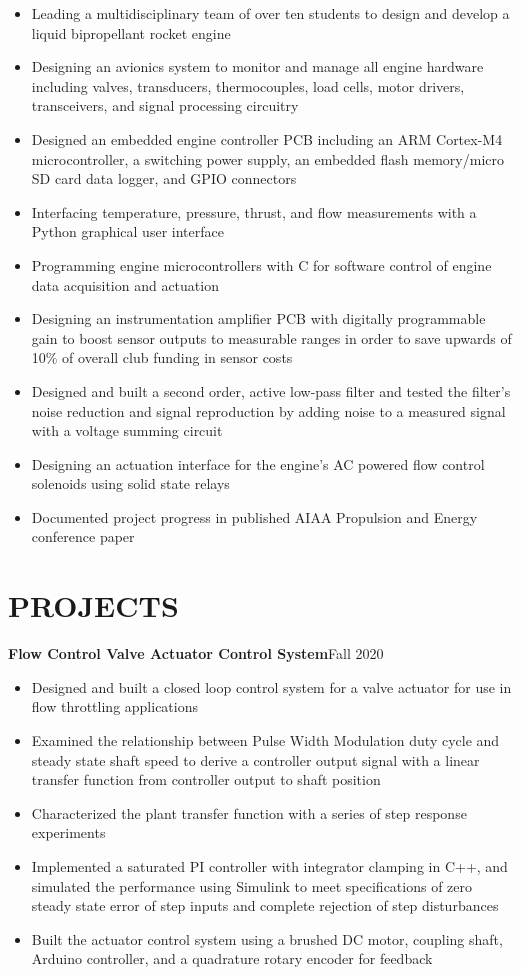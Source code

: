 \documentclass{article}
\begin{document}
\begin{itemize}
\item{Leading a multidisciplinary team of over ten students to design and develop a liquid bipropellant rocket engine}
	\item{Designing an avionics system to monitor and manage all engine hardware including valves, transducers, thermocouples, load cells, motor drivers, transceivers, and signal processing circuitry}
\item{Designed an embedded engine controller PCB including an ARM Cortex-M4 microcontroller, a switching power supply, an embedded flash memory/micro SD card data logger, and GPIO connectors}
	\item{Interfacing temperature, pressure, thrust, and flow measurements with a Python graphical user interface}
	\item{Programming engine microcontrollers with C for software control of engine data acquisition and actuation}
	\item{Designing an instrumentation amplifier PCB with digitally programmable gain to boost sensor outputs to measurable ranges in order to save upwards of 10\% of overall club funding in sensor costs}
	\item{Designed and built a second order, active low-pass filter and tested the filter's noise reduction and signal reproduction by adding noise to a measured signal with a voltage summing circuit}
\item{Designing an actuation interface for the engine's AC powered flow control solenoids using solid state relays}
	\item{Documented project progress in published AIAA Propulsion and Energy conference paper}
\end{itemize}
\section{PROJECTS}
\vspace{0.5em}
\textbf{Flow Control Valve Actuator Control System}\hfill Fall 2020
\vspace{0.5em}
\begin{itemize}
	\item {Designed and built a closed loop control system for a valve actuator for use in flow throttling applications}
	\item {Examined the relationship between Pulse Width Modulation duty cycle and steady state shaft speed to derive a controller output signal with a linear transfer function from controller output to shaft position} 
	\item {Characterized the plant transfer function with a series of step response experiments}
 \item  {Implemented a saturated PI controller with integrator clamping in C++, and simulated the performance using Simulink to meet specifications of zero steady state error of step inputs and complete rejection of step disturbances}
	\item  {Built the actuator control system using a brushed DC motor, coupling shaft, Arduino controller, and a quadrature rotary encoder for feedback}
\end{itemize}
\vspace{0.5em}

\thispagestyle{empty}
\end{document}
